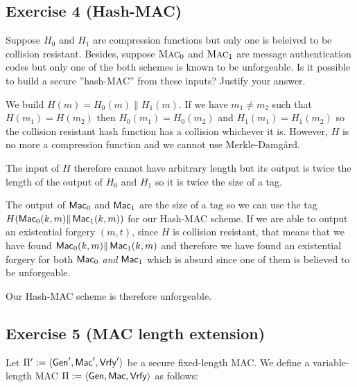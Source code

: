 \subsection{Exercise 4 (Hash-MAC)}
Suppose $H_0$ and $H_1$ are compression functions but only one is beleived to be collision resistant.
Besides, suppose $\textsc{Mac}_0$ and $\textsc{Mac}_1$ are message authentication codes but only one
of the both schemes is known to be unforgeable. Is it possible to build a secure ''hash-MAC'' from these
inputs? Justify your answer.
\begin{solution}
  We build $H(m) = H_0(m)\|H_1(m)$.
  If we have $m_1 \neq m_2$ such that $H(m_1) = H(m_2)$ then $H_0(m_1) = H_0(m_2)$ and
  $H_1(m_1) = H_1(m_2)$ so the collision resistant hash function has a collision whichever it is.
  However, $H$ is no more a compression function and we cannot use Merkle-Damg\aa{}rd.

  The input of $H$ therefore cannot have arbitrary length but its output is twice the length of the output of $H_0$ and $H_1$ so it is twice the size of a tag.

  The output of $\operatorname{\mathsf{Mac}}_0$ and $\operatorname{\mathsf{Mac}}_1$ are the size of a tag so we can use the tag
  $H(\operatorname{\mathsf{Mac}}_0(k,m)\|\operatorname{\mathsf{Mac}}_1(k,m))$ for our Hash-MAC scheme.
  If we are able to output an existential forgery $(m, t)$, since $H$ is collision resistant, that means that we have found $\operatorname{\mathsf{Mac}}_0(k,m)\|\operatorname{\mathsf{Mac}}_1(k,m)$ and therefore we have found an existential forgery for both $\operatorname{\mathsf{Mac}}_0$ \emph{and} $\operatorname{\mathsf{Mac}}_1$ which is absurd since one of them is believed to be unforgeable.

  Our Hash-MAC scheme is therefore unforgeable.
\end{solution}

\subsection{Exercise 5 (MAC length extension)}
Let $\Pi':=\langle\operatorname{\mathsf{Gen}}',\operatorname{\mathsf{Mac}}',\operatorname{\mathsf{Vrfy}}'\rangle$ be a secure fixed-length MAC. We define a variable-length MAC $\Pi:=\langle\operatorname{\mathsf{Gen}},\operatorname{\mathsf{Mac}},\operatorname{\mathsf{Vrfy}}\rangle$ as follows:

